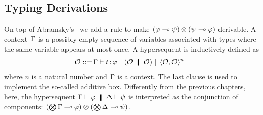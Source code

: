 \subsection{Typing Derivations}

On top of Abramsky's~\citep{abramsky1993computational} we add a rule to
make $(\varphi\multimap\psi)\otimes(\psi\multimap\varphi)$ derivable.
A context~$\Gamma$ is a possibly empty sequence of variables associated with
types where the same variable appears at most once.
A hypersequent is inductively defined as
\begin{align*}
 \hypert ::=\, &\G\tr\tj{t}{\phi}
 \mid\, (\hypert\hmid \hypert)
 \mid\, \lpair{\hypert,\hypert}^n
\end{align*}
where $n$ is a natural number and $\Gamma$ is a context. 
The last clause is used to implement the so-called additive box.
Differently from the previous chapters,
here, the hypersequent $\G\tr\phi\hmid \D\tr\psi$ is interpreted as the
conjunction of components:
$(\bigotimes\Gamma\multimap\varphi)\otimes (\bigotimes\Delta\multimap\psi)$.

